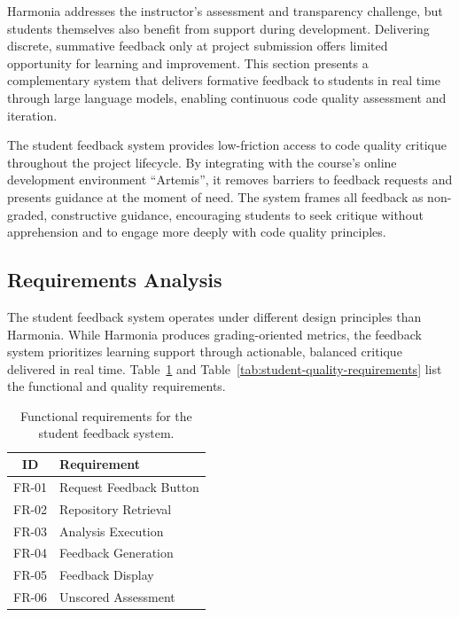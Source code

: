 \documentclass[sigconf]{acmart}
\begin{document}
Harmonia addresses the instructor's assessment and transparency challenge, but students themselves also benefit from support during development. Delivering discrete, summative feedback only at project submission offers limited opportunity for learning and improvement. This section presents a complementary system that delivers formative feedback to students in real time through large language models, enabling continuous code quality assessment and iteration.

The student feedback system provides low-friction access to code quality critique throughout the project lifecycle. By integrating with the course's online development environment ``Artemis'', it removes barriers to feedback requests and presents guidance at the moment of need. The system frames all feedback as non-graded, constructive guidance, encouraging students to seek critique without apprehension and to engage more deeply with code quality principles.

\subsection{Requirements Analysis}

The student feedback system operates under different design principles than Harmonia. While Harmonia produces grading-oriented metrics, the feedback system prioritizes learning support through actionable, balanced critique delivered in real time. Table~\ref{tab:student-functional-requirements} and Table~\ref{tab:student-quality-requirements} list the functional and quality requirements.

\begin{table}[h]
  \caption{Functional requirements for the student feedback system.}
  \label{tab:student-functional-requirements}
  \begin{tabular}{cl}
    \toprule
    \textbf{ID} & \textbf{Requirement} \\
    \midrule
    FR-01 & Request Feedback Button \\
    FR-02 & Repository Retrieval \\
    FR-03 & Analysis Execution \\
    FR-04 & Feedback Generation \\
    FR-05 & Feedback Display \\
    FR-06 & Unscored Assessment \\
    \bottomrule
  \end{tabular}
\end{table}
\end{document}
